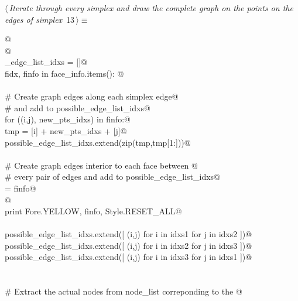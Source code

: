 \documentclass[11.5pt]{report}
\begin{document}
\begin{flushleft} \small
\begin{minipage}{\linewidth}\label{scrap15}\raggedright\small
{} $\langle\,${\itshape Iterate through every simplex and draw the complete graph on the points on the edges of simplex}\nobreak\ {\footnotesize {13}}$\,\rangle\equiv$
\vspace{-1ex}
\begin{list}{}{} \item
\mbox{}\verb@   @\\
\mbox{}\verb@    @\\
\mbox{}\verb@possible_edge_list_idxs = []@\\
\mbox{}\verb@for fidx, finfo in face_info.items(): @\\
\mbox{}\verb@@\\
\mbox{}\verb@    # Create graph edges along each simplex edge@\\
\mbox{}\verb@    # and add to possible_edge_list_idxs@\\
\mbox{}\verb@    for ((i,j), new_pts_idxs) in finfo:@\\
\mbox{}\verb@         tmp = [i] + new_pts_idxs + [j]@\\
\mbox{}\verb@         possible_edge_list_idxs.extend(zip(tmp,tmp[1:]))@\\
\mbox{}\verb@@\\
\mbox{}\verb@    # Create graph edges interior to each face between @\\
\mbox{}\verb@    # every pair of edges and add to possible_edge_list_idxs@\\
\mbox{}= finfo@\\
\mbox{}\verb@    @\\
\mbox{}\verb@    print Fore.YELLOW, finfo, Style.RESET_ALL@\\
\mbox{}\verb@@\\
\mbox{}\verb@    possible_edge_list_idxs.extend([ (i,j) for i in idxs1 for j in idxs2 ])@\\
\mbox{}\verb@    possible_edge_list_idxs.extend([ (i,j) for i in idxs2 for j in idxs3 ])@\\
\mbox{}\verb@    possible_edge_list_idxs.extend([ (i,j) for i in idxs3 for j in idxs1 ])@\\
\mbox{}\verb@@\\
\mbox{}\verb@@\\
\mbox{}\verb@# Extract the actual nodes from node_list correponding to the @\\

\end{list}
\end{minipage}
\end{flushleft}
\end{document}
